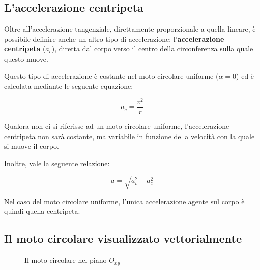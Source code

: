 \documentclass[oneside]{book}
\begin{document}
\subsection{L'accelerazione centripeta}

Oltre all'accelerazione tangenziale, direttamente proporzionale a
quella lineare, è possibile definire anche un altro tipo di
accelerazione: l'\textbf{accelerazione centripeta} ($a_c$), diretta dal
corpo verso il centro della circonferenza sulla quale questo muove.

Questo tipo di accelerazione è costante nel moto circolare uniforme
($\alpha=0$) ed è calcolata mediante le seguente equazione:

\begin{equation}
    a_c=\frac{v^2}{r}
    \label{eq:acc_c}
\end{equation}

Qualora non ci si riferisse ad un moto circolare uniforme,
l'accelerazione centripeta non sarà costante, ma variabile in
funzione della velocità con la quale si muove il corpo.

Inoltre, vale la seguente relazione:

\begin{equation}
    a=\sqrt{a_t^2 + a_c^2}
    \label{eq:acc_moto_cir}
\end{equation}

Nel caso del moto circolare uniforme, l'unica
accelerazione agente sul corpo è quindi quella centripeta.

\subsection{Il moto circolare visualizzato vettorialmente}

\vskip 0.1in

\begin{wrapfigure}[12]{l}{0.5\textwidth}

    \caption{Il moto circolare nel piano $O_{xy}$} \label{fig:moto_circolare}
\end{wrapfigure}
\end{document}
